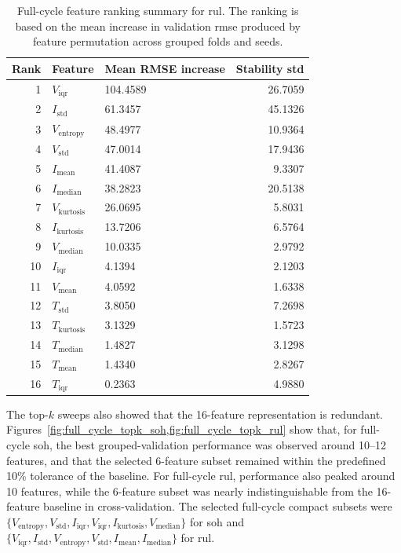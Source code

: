 \begin{table}[H]
    \centering
    \caption{Full-cycle feature ranking summary for \ac{rul}. The ranking is based on the mean increase in validation \ac{rmse} produced by feature permutation across grouped folds and seeds.}
    \label{tab:full_cycle_rul_ranking}
    \begin{tabular}{rllr}
    \toprule
    Rank & Feature & Mean RMSE increase & Stability std \\
    \midrule
    1 & $V_{\mathrm{iqr}}$ & 104.4589 & 26.7059 \\
    2 & $I_{\mathrm{std}}$ & 61.3457 & 45.1326 \\
    3 & $V_{\mathrm{entropy}}$ & 48.4977 & 10.9364 \\
    4 & $V_{\mathrm{std}}$ & 47.0014 & 17.9436 \\
    5 & $I_{\mathrm{mean}}$ & 41.4087 & 9.3307 \\
    6 & $I_{\mathrm{median}}$ & 38.2823 & 20.5138 \\
    7 & $V_{\mathrm{kurtosis}}$ & 26.0695 & 5.8031 \\
    8 & $I_{\mathrm{kurtosis}}$ & 13.7206 & 6.5764 \\
    9 & $V_{\mathrm{median}}$ & 10.0335 & 2.9792 \\
    10 & $I_{\mathrm{iqr}}$ & 4.1394 & 2.1203 \\
    11 & $V_{\mathrm{mean}}$ & 4.0592 & 1.6338 \\
    12 & $T_{\mathrm{std}}$ & 3.8050 & 7.2698 \\
    13 & $T_{\mathrm{kurtosis}}$ & 3.1329 & 1.5723 \\
    14 & $T_{\mathrm{median}}$ & 1.4827 & 3.1298 \\
    15 & $T_{\mathrm{mean}}$ & 1.4340 & 2.8267 \\
    16 & $T_{\mathrm{iqr}}$ & 0.2363 & 4.9880 \\
    \bottomrule
    \end{tabular}
\end{table}

The top-\(k\) sweeps also showed that the 16-feature representation is redundant. Figures~\cref{fig:full_cycle_topk_soh,fig:full_cycle_topk_rul} show that, for full-cycle \ac{soh}, the best grouped-validation performance was observed around 10--12 features, and that the selected 6-feature subset remained within the predefined 10\% tolerance of the baseline. For full-cycle \ac{rul}, performance also peaked around 10 features, while the 6-feature subset was nearly indistinguishable from the 16-feature baseline in cross-validation. The selected full-cycle compact subsets were \(\{V_{\mathrm{entropy}}, V_{\mathrm{std}}, I_{\mathrm{iqr}}, V_{\mathrm{iqr}}, I_{\mathrm{kurtosis}}, V_{\mathrm{median}}\}\) for \ac{soh} and \(\{V_{\mathrm{iqr}}, I_{\mathrm{std}}, V_{\mathrm{entropy}}, V_{\mathrm{std}}, I_{\mathrm{mean}}, I_{\mathrm{median}}\}\) for \ac{rul}.

